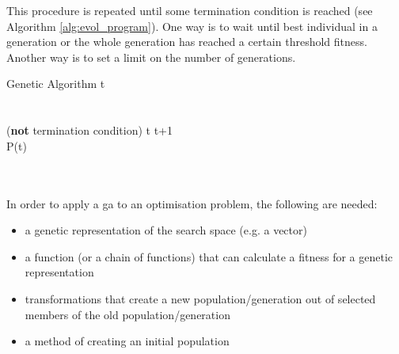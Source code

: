 This procedure is repeated until some termination condition is reached (see Algorithm \ref{alg:evol_program}). One way is to wait until best individual in a generation or the whole generation has reached a certain threshold fitness.  Another way is to set a limit on the number of generations. 



\begin{pseudocode}{Genetic Algorithm}{ }
\label{alg:evol_program}
t  \\
\\
\\
\WHILE (\textrm{\textbf{not} termination condition}) \DO
\BEGIN
t \gets t+1\\
P(t) \GETS {}\\
\\
\\
\END
\ENDMAIN
\end{pseudocode}




In order to apply a \gls{ga} to an optimisation problem, the following are needed:
\begin{itemize}
\item a genetic representation of the search space (e.g. a vector)
\item a function (or a chain of functions) that can calculate a fitness for a genetic representation
\item transformations that create a new population/generation out of selected members of the old population/generation
\item a method of creating an initial population
\end{itemize}


